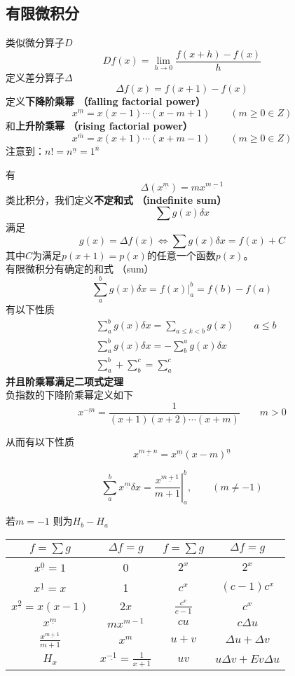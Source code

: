 \subsection{有限微积分}

类似微分算子$D$
$$
D f(x)=\lim\limits_{h\rightarrow 0}\frac{f(x+h)-f(x)}{h}
$$
定义差分算子$\Delta$
$$
\Delta f(x)= f(x+1)-f(x)
$$
定义\textbf{下降阶乘幂 （falling factorial power）}
$$
x^{\underline{m}}=x(x-1)\cdots(x-m+1)\qquad (m\ge 0 \in Z)
$$
和\textbf{上升阶乘幂 （rising factorial power）}
$$
x^{\overline{m}}=x(x+1)\cdots(x+m-1)\qquad (m\ge 0 \in Z)
$$
注意到：$n!=n^{\underline{n}}=1^{\overline{n}}$

有
$$
\Delta(x^{\underline{m}})=mx^{\underline{m-1}}
$$
类比积分，我们定义\textbf{不定和式 （indefinite sum）}
$$
\sum g(x)\delta x
$$
满足
$$
g(x)=\Delta f(x)\iff \sum g(x)\delta x=f(x)+C
$$
其中$C$为满足$p(x+1)=p(x)$的任意一个函数$p(x)$。\\

有限微积分有确定的和式 （sum）
$$
\sum_a^b g(x)\delta x=f(x)|_a^b=f(b)-f(a)
$$
有以下性质
$$
\begin{aligned}
&\sum_a^b g(x)\delta x= \sum_{a\le k < b} g(x) \qquad a\le b\\
&\sum_a^{b}g(x) \delta x =-\sum_{b}^ag(x)\delta x\\
&\sum_a^b+\sum_b^c=\sum_a^c
\end{aligned}
$$
\textbf{并且阶乘幂满足二项式定理}\\

负指数的下降阶乘幂定义如下
$$
x^{\underline{-m}}= \frac{1}{(x+1)(x+2)\cdots(x+m)} \qquad m>0
$$

从而有以下性质
$$
x^{\underline{m+n}}=x^{\underline{m}}(x-m)^{\underline{n}}
$$

$$
\sum_{a}^{b} x^{\underline{m}}  \delta x=\left. \frac{x^{\underline{m+1}}}{m+1}\right|_a^b, \qquad (m\neq -1)
$$

若$m=-1$ 则为$H_b-H_a$

\begin{tabular}{|c|c|c|c|}
  \hline
  \( f = \sum g \) & \( \Delta f = g \) & \( f = \sum g \) & \( \Delta f = g \) \\
  \hline
  \( x^{\underline{0}} = 1 \)    & 0                & \( 2^x \)        & \( 2^x \)          \\
  \hline
  \( x^{\underline{1}} = x \) & 1                & \( c^x \)        & \( (c - 1)c^x \)   \\
  \hline
  \( x^{\underline{2}} = x(x - 1) \) & \( 2x \)      & \( \frac{c^x}{c - 1} \) & \( c^x \)     \\
  \hline
  \( x^{\underline{m}} \)         & \( mx^{m-1} \)   & \( cu \)         & \( c\Delta u \)    \\
  \hline
  \( \frac{x^{\underline{m+1}}}{m + 1} \) & \( x^m \) & \( u + v \)      & \( \Delta u + \Delta v \) \\
  \hline
  \( H_x \)         & \( x^{\underline{-1}} = \frac{1}{x + 1} \) & \( uv \) & \( u\Delta v + Ev\Delta u \) \\
  \hline
  \end{tabular}

